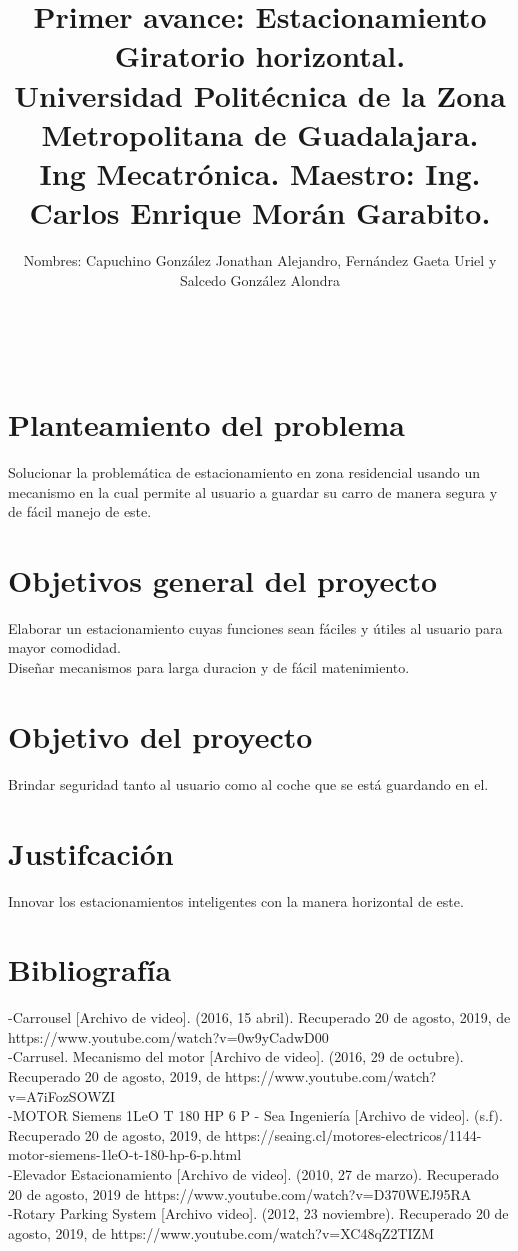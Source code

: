\documentclass[12pt,letterpaper]{article}
\begin{document}
\maketitle

\title{Primer avance: Estacionamiento Giratorio horizontal.\\ 
Universidad Politécnica de la Zona Metropolitana de Guadalajara.\\ 
Ing Mecatrónica. Maestro: Ing. Carlos Enrique Morán Garabito.}\\
\author{Nombres: Capuchino González Jonathan Alejandro, Fernández Gaeta Uriel y Salcedo González Alondra}

\section{Planteamiento del problema}
Solucionar la problemática de estacionamiento en zona residencial usando un mecanismo en la cual permite al usuario a guardar su carro de manera segura y de fácil manejo de este.

\section{Objetivos general del proyecto}
Elaborar un estacionamiento cuyas funciones sean fáciles y útiles al usuario para mayor comodidad.\\
Diseñar mecanismos para larga duracion y de fácil matenimiento.

\section{Objetivo del proyecto}
Brindar seguridad tanto al usuario como al coche que se está guardando en el.

\section{Justifcación}
Innovar los estacionamientos inteligentes con la manera horizontal de este.

\section{Bibliografía}
-Carrousel [Archivo de video]. (2016, 15 abril). Recuperado 20 de agosto, 2019, de https://www.youtube.com/watch?v=0w9yCadwD00\\
-Carrusel. Mecanismo del motor [Archivo de video]. (2016, 29 de octubre). Recuperado 20 de agosto, 2019, de https://www.youtube.com/watch?v=A7iFozSOWZI\\
-MOTOR Siemens 1LeO T 180 HP 6 P - Sea Ingeniería [Archivo de video]. (s.f). Recuperado 20 de agosto, 2019, de https://seaing.cl/motores-electricos/1144-motor-siemens-1leO-t-180-hp-6-p.html\\
-Elevador Estacionamiento [Archivo de video]. (2010, 27 de marzo). Recuperado 20 de agosto, 2019 de https://www.youtube.com/watch?v=D370WEJ95RA\\
-Rotary Parking System [Archivo video]. (2012, 23 noviembre). Recuperado 20 de agosto, 2019, de https://www.youtube.com/watch?v=XC48qZ2TIZM
\end{document}
